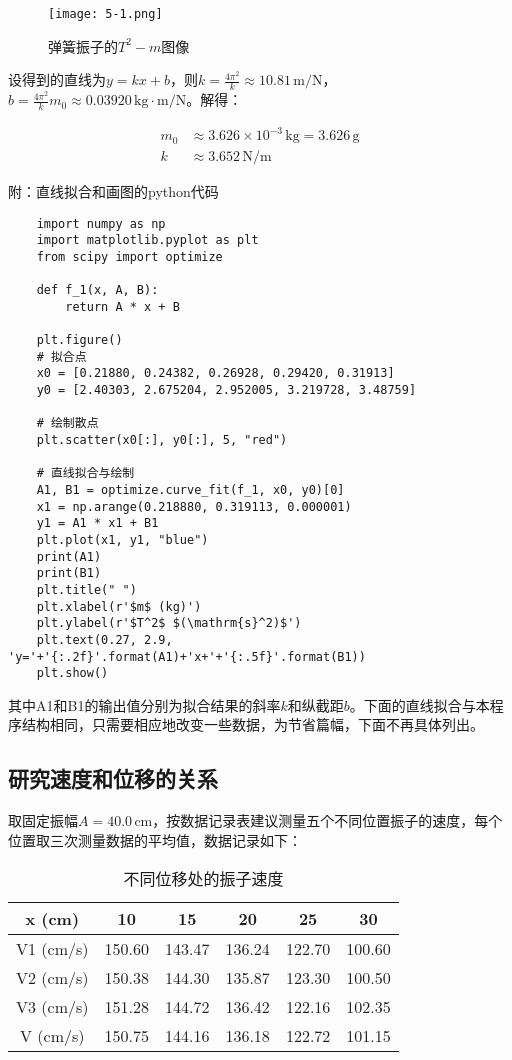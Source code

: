 \documentclass[12pt]{article}
\begin{document}
\begin{figure}[htbp]
    \centering
    \texttt{[image: 5-1.png]}
    \caption{弹簧振子的$T^2-m$图像}
\end{figure}

设得到的直线为$y=kx+b$，则$k=\frac{4\pi^2}{k}\approx10.81\,\mathrm{m/N}$，$b=\frac{4\pi^2}{k}m_0\approx0.03920\,\mathrm{kg \cdot m/N}$。解得：

\[
    \begin{aligned}
        m_0&\approx3.626\times10^{-3}\,\mathrm{kg}=3.626\,\mathrm{g} \\
        k&\approx3.652\,\mathrm{N/m}
    \end{aligned}
\]

附：直线拟合和画图的python代码

\begin{lstlisting}
    import numpy as np
    import matplotlib.pyplot as plt
    from scipy import optimize
    
    def f_1(x, A, B):
        return A * x + B
    
    plt.figure()
    # 拟合点
    x0 = [0.21880, 0.24382, 0.26928, 0.29420, 0.31913]
    y0 = [2.40303, 2.675204, 2.952005, 3.219728, 3.48759]
    
    # 绘制散点
    plt.scatter(x0[:], y0[:], 5, "red")
    
    # 直线拟合与绘制
    A1, B1 = optimize.curve_fit(f_1, x0, y0)[0]
    x1 = np.arange(0.218880, 0.319113, 0.000001)
    y1 = A1 * x1 + B1
    plt.plot(x1, y1, "blue")
    print(A1)
    print(B1)
    plt.title(" ")
    plt.xlabel(r'$m$ (kg)')
    plt.ylabel(r'$T^2$ $(\mathrm{s}^2)$')
    plt.text(0.27, 2.9, 'y='+'{:.2f}'.format(A1)+'x+'+'{:.5f}'.format(B1))
    plt.show()
\end{lstlisting}

其中A1和B1的输出值分别为拟合结果的斜率$k$和纵截距$b$。下面的直线拟合与本程序结构相同，只需要相应地改变一些数据，为节省篇幅，下面不再具体列出。

\subsection{研究速度和位移的关系}
取固定振幅$A=40.0\,\mathrm{cm}$，按数据记录表建议测量五个不同位置振子的速度，每个位置取三次测量数据的平均值，数据记录如下：

\begin{table}[htbp]
    \centering
    \begin{tabular}{|c|c|c|c|c|c|}
    \hline
    x (cm) & 10 & 15 & 20 & 25 & 30 \\
    \hline
    V1 (cm/s) & 150.60  & 143.47  & 136.24  & 122.70  & 100.60  \\
    \hline
    V2 (cm/s) & 150.38  & 144.30  & 135.87  & 123.30  & 100.50  \\
    \hline
    V3 (cm/s) & 151.28  & 144.72  & 136.42  & 122.16  & 102.35  \\
    \hline
    V (cm/s) & 150.75  & 144.16  & 136.18  & 122.72  & 101.15  \\
    \hline
    \end{tabular}%
    \caption{不同位移处的振子速度}
\end{table}%
\end{document}

